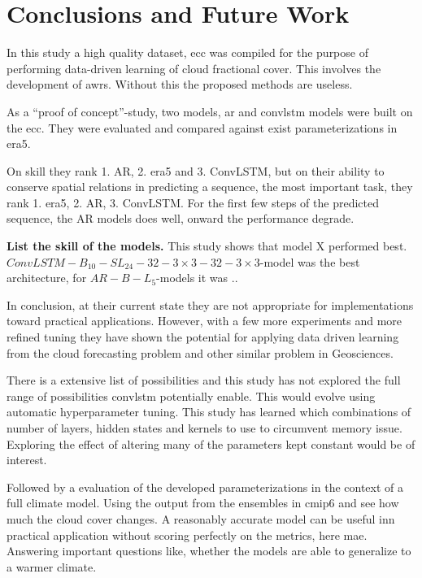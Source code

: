 \chapter{Conclusions and Future Work}
In this study a high quality dataset, \acrfull{ecc} was compiled for the purpose of performing data-driven learning of cloud fractional cover. This involves the development of \acrfull{awrs}. Without this the proposed methods are useless.
 
As a ``proof of concept''-study, two models, \acrfull{ar} and \acrfull{convlstm} models were built on the \acrshort{ecc}. They were evaluated and compared against exist parameterizations in \acrshort{era5}. 

On skill they rank 1. AR, 2. \acrshort{era5} and 3. ConvLSTM, but on their ability to conserve spatial relations in predicting a sequence, the most important task, they rank 1. \acrshort{era5}, 2. AR, 3. ConvLSTM.
For the first few steps of the predicted sequence, the AR models does well, onward the performance degrade.

\textbf{List the skill of the models.}
This study shows that model X performed best. $ConvLSTM-B_{10}-SL_{24}-32-3\times3-32-3 \times3$-model was the best architecture, for $AR-B-L_5$-models it was ..

In conclusion, at their current state they are not appropriate for implementations toward practical applications. However, with a few more experiments and more refined tuning they have shown the potential for applying data driven learning from the cloud forecasting problem and other similar problem in Geosciences. 

There is a extensive list of possibilities and this study has not explored the full range of possibilities \acrshort{convlstm} potentially enable. 
This would evolve using automatic hyperparameter tuning. This study has learned which combinations of number of layers, hidden states and kernels to use to circumvent memory issue. Exploring the effect of altering many of the parameters kept constant would be of interest.

Followed by a evaluation of the developed parameterizations in the context of a full climate model. Using the output from the ensembles in \acrshort{cmip6} and see how much the cloud cover changes. A reasonably accurate model can be useful inn practical application without scoring perfectly on the metrics, here \acrshort{mae}. Answering important questions like, whether the models are able to generalize to a warmer climate.

